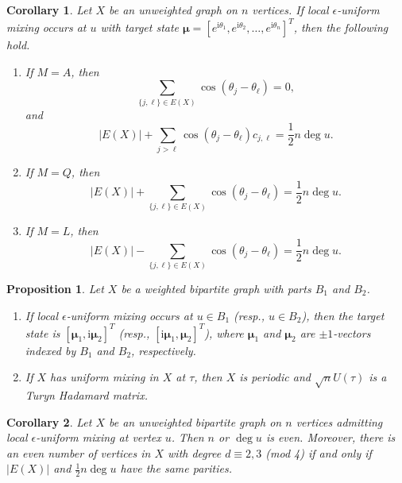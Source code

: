 \documentclass[10pt,a4paper]{amsart}
\newtheorem{proposition}{Proposition}
\newtheorem{corollary}{Corollary}
\newcommand{\bmu}{{\boldsymbol{\mu}}}
\def\ii{\mathrm{i}}
\begin{document}
\begin{corollary}
\label{Cor:eqs}
Let $X$ be an unweighted graph on $n$ vertices. If local $\epsilon$-uniform mixing occurs at $u$ with target state $\bmu=[e^{\ii \theta_1},e^{\ii \theta_2},\ldots,e^{\ii \theta_{n}}]^T$, then the following hold.
\begin{enumerate}
\item If $M=A$, then
\begin{equation}
\label{Eq:cos}
\sum_{\{j,\ell\}\in E(X)}\cos(\theta_j-\theta_{\ell})=0,
\end{equation}
and
\begin{equation}
\label{Eq:cos1}
|E(X)|+\sum_{j>\ell}\cos(\theta_j-\theta_{\ell})c_{j,\ell}=\frac{1}{2}n\operatorname{deg}u.
\end{equation}
\item If $M=Q$, then
\begin{equation}
\label{Eq:cosQ}
|E(X)|+\sum_{\{j,\ell\}\in E(X)}\cos(\theta_j-\theta_{\ell})=\frac{1}{2}n\operatorname{deg}u.
\end{equation}
\item If $M=L$, then
\begin{equation}
\label{Eq:cosL}
|E(X)|-\sum_{\{j,\ell\}\in E(X)}\cos(\theta_j-\theta_{\ell})=\frac{1}{2}n\operatorname{deg}u.
\end{equation}
\end{enumerate}
\end{corollary}

\begin{proposition}
\label{1}
Let $X$ be a weighted bipartite graph with parts $B_1$ and $B_2$.
\begin{enumerate}
\item If local $\epsilon$-uniform mixing occurs at $u\in B_1$ (resp., $u\in B_2$), then the target state is $[\bmu_1,\ii\bmu_2]^T$ (resp., $[\ii\bmu_1,\bmu_2]^T$), where $\bmu_1$ and $\bmu_2$ are $\pm 1$-vectors indexed by $B_1$ and $B_2$, respectively.
\item If $X$ has uniform mixing in $X$ at $\tau$, then $X$ is periodic and $\sqrt{n}U(\tau)$ is a Turyn Hadamard matrix.
\end{enumerate}
\end{proposition}

\begin{corollary}
\label{nodd}
Let $X$ be an unweighted bipartite graph on $n$ vertices admitting local $\epsilon$-uniform mixing at vertex $u$. Then $n$ or $\operatorname{deg}u$ is even. Moreover, there is an even number of vertices in $X$ with degree $d\equiv 2,3$ (mod 4) if and only if $|E(X)|$ and $\frac{1}{2}n\operatorname{deg}u$ have the same parities.
\end{corollary}
\end{document}
